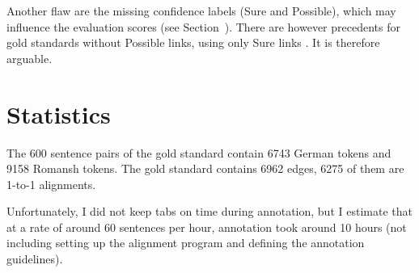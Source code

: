 Another flaw are the missing confidence labels (Sure and Possible), which may influence the evaluation scores (see Section~). 
There are however precedents for gold standards without Possible links, using only Sure links \autocites{clematide2018,mihalcea-pedersen-2003-evaluation}. It is therefore arguable.



\section{Statistics}
The 600 sentence pairs of the gold standard contain 6743 German tokens and 9158 Romansh tokens. 
The gold standard contains 6962 edges, 6275 of them are 1-to-1 alignments.

Unfortunately, I did not keep tabs on time during annotation, but I  estimate that at a rate of around 60 sentences per hour, annotation took around 10 hours (not including setting up the alignment program and defining the annotation guidelines). 

